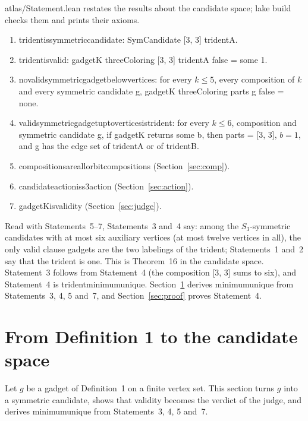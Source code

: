 \documentclass[11pt,a4paper]{article}
\newcommand{\leanus}{\textunderscore\allowbreak}
\newcommand{\lean}[1]{{\ttfamily\let\_\leanus #1}}
\theoremstyle{definition}
\begin{document}
\lean{atlas/Statement.lean} restates the results about the candidate space;
\lean{lake build} checks them and prints their axioms.
\begin{enumerate}
\item \lean{trident\_is\_symmetric\_candidate}: \lean{SymCandidate [3, 3] tridentA}.
\item \lean{trident\_is\_valid}: \lean{gadgetK threeColoring [3, 3] tridentA false = some 1}.
\item \lean{no\_valid\_symmetric\_gadget\_below\_12\_vertices}: for every
$k\le5$, every composition of $k$ and every symmetric candidate \lean{g},
\lean{gadgetK threeColoring parts g false = none}.
\item \lean{valid\_symmetric\_gadget\_up\_to\_12\_vertices\_is\_trident}: for
every $k\le6$, composition and symmetric candidate \lean{g}, if
\lean{gadgetK} returns \lean{some b}, then \lean{parts = [3, 3]}, $b=1$, and
\lean{g} has the edge set of \lean{tridentA} or of \lean{tridentB}.
\item \lean{compositions\_are\_all\_orbit\_compositions} (Section~\ref{sec:comp}).
\item \lean{candidate\_action\_is\_s3\_action} (Section~\ref{sec:action}).
\item \lean{gadgetK\_is\_validity} (Section~\ref{sec:judge}).
\end{enumerate}
Read with Statements~5--7, Statements~3 and~4 say: among the $S_3$-symmetric
candidates with at most six auxiliary vertices (at most twelve vertices in
all), the only valid clause gadgets are the two labelings of the trident;
Statements~1 and~2 say that the trident is one. This is Theorem~16 in the
candidate space. Statement~3 follows from Statement~4 (the composition
\lean{[3, 3]} sums to six), and Statement~4 is \lean{trident\_minimum\_unique}.
Section~\ref{sec:def1} derives \lean{minimum\_unique} from Statements~3, 4, 5
and~7, and Section~\ref{sec:proof} proves Statement~4.

\section{From Definition 1 to the candidate space}\label{sec:def1}

Let $g$ be a gadget of Definition~1 on a finite vertex set. This section
turns $g$ into a symmetric candidate, shows that validity becomes the verdict
of the judge, and derives \lean{minimum\_unique} from Statements~3, 4, 5
and~7.
\end{document}
